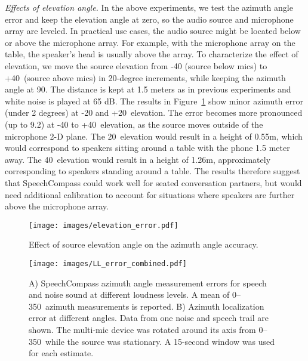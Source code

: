 \textit{Effects of elevation angle.} In the above experiments, we test the azimuth angle error and keep the elevation angle at zero, so the audio source and microphone array are leveled. In practical use cases, the audio source might be located below or above the microphone array. For example, with the microphone array on the table, the speaker's head is usually above the array. To characterize the effect of elevation, we move the source elevation from -40 (source below mics) to +40\textdegree~(source above mics) in 20-degree increments, while keeping the azimuth angle at 90\textdegree. The distance is kept at 1.5 meters as in previous experiments and white noise is played at 65 dB. The results in Figure~\ref{fig:elevation_effects} show minor azimuth error (under 2 degrees) at -20 and +20\textdegree~elevation. The error becomes more pronounced (up to 9.2\textdegree) at -40 to +40\textdegree~elevation, as the source moves outside of the microphone 2-D plane. %
The 20\textdegree~elevation would result in a height of 0.55m, which would correspond to speakers sitting around a table with the phone 1.5 meter away. The 40\textdegree~elevation would result in a height of 1.26m, approximately corresponding to speakers standing around a table. The results therefore suggest that SpeechCompass could work well for seated conversation partners, but would need additional calibration to account for situations where speakers are further above the microphone array. 

\begin{figure}
  \centering
  \texttt{[image: images/elevation\_error.pdf]}
  \caption{Effect of source elevation angle on the azimuth angle accuracy.}
  \label{fig:elevation_effects}  
\end{figure}


\begin{figure*}
  \centering
  \texttt{[image: images/LL\_error\_combined.pdf]}
  \caption{A) SpeechCompass azimuth angle measurement errors for speech and noise sound at different loudness levels. A mean of 0--350\textdegree~azimuth measurements is reported. B) Azimuth localization error at different angles. Data from one noise and speech trail are shown. The multi-mic device was rotated around its axis from 0--350\textdegree~while the source was stationary. A 15-second window was used for each estimate. }
  \label{fig:error}  
\end{figure*}

